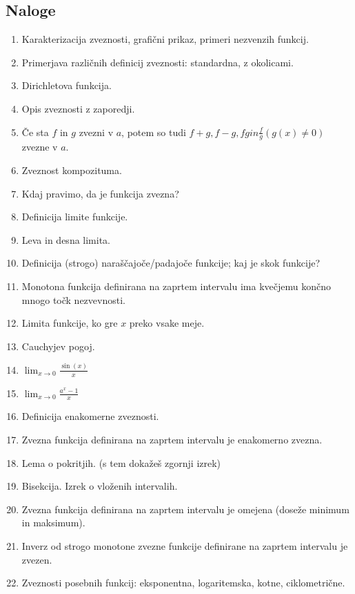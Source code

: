 \documentclass[a4paper,12pt]{report}
\begin{document}
\subsection*{Naloge}

\begin{enumerate}
    \item Karakterizacija zveznosti, grafični prikaz, primeri nezvenzih funkcij.
    \item Primerjava različnih definicij zveznosti: standardna, z okolicami.
    \item Dirichletova funkcija.
    \item Opis zveznosti z zaporedji.
    \item Če sta $f$ in $g$ zvezni v $a$, potem so tudi $f+g, f-g, fg in \frac{f}{g} (g(x) \neq 0)$ zvezne v $a$.
    \item Zveznost kompozituma.
    \item Kdaj pravimo, da je funkcija zvezna?
    \item Definicija limite funkcije.
    \item Leva in desna limita.
    \item Definicija (strogo) naraščajoče/padajoče funkcije; kaj je skok funkcije?
    \item Monotona funkcija definirana na zaprtem intervalu ima kvečjemu končno mnogo točk nezvevnosti.
    \item Limita funkcije, ko gre $x$ preko vsake meje.
    \item Cauchyjev pogoj.
    \item $\lim_{x \to 0} \frac{\sin(x)}{x}$
    \item $\lim_{x \to 0} \frac{a^x - 1}{x}$
    \item Definicija enakomerne zveznosti.
    \item Zvezna funkcija definirana na zaprtem intervalu je enakomerno zvezna.
    \item Lema o pokritjih. (s tem dokažeš zgornji izrek)
    \item Bisekcija. Izrek o vloženih intervalih.
    \item Zvezna funkcija definirana na zaprtem intervalu je omejena (doseže minimum in maksimum).
    \item Inverz od strogo monotone zvezne funkcije definirane na zaprtem intervalu je zvezen.
    \item Zveznosti posebnih funkcij: eksponentna, logaritemska, kotne, ciklometrične.
\end{enumerate}
\end{document}
